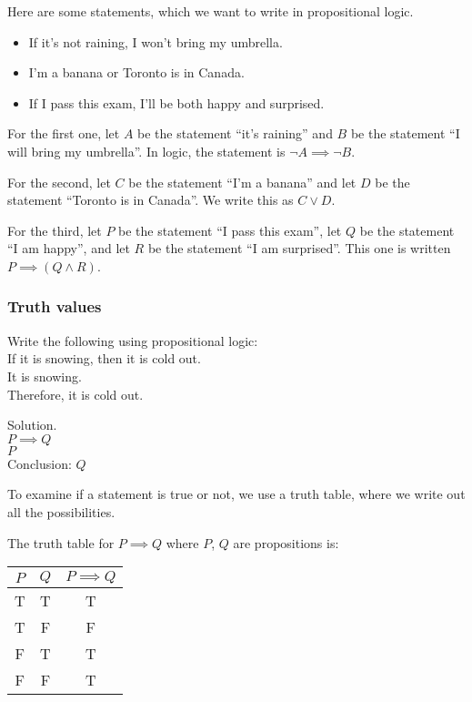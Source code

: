 \documentclass{article}
\begin{document}
\begin{example}
Here are some statements, which we want to write in propositional logic.
\begin{itemize}
              \item If it's not raining, I won't bring my umbrella.
              \item I'm a banana or Toronto is in Canada.
              \item If I pass this exam, I'll be both happy and surprised.
\end{itemize}

For the first one, let $A$ be the statement ``it's raining'' and $B$ be the statement ``I will bring my umbrella''. In logic, the statement is $\neg A \implies \neg B$.

For the second, let $C$ be the statement ``I'm a banana'' and let $D$ be the statement ``Toronto is in Canada''. We write this as $C \vee D$.

For the third, let $P$ be the statement ``I pass this exam'', let $Q$ be the statement ``I am happy'', and let $R$ be the statement ``I am surprised''. This one is written $P \implies (Q \wedge R)$.
\end{example}

\subsubsection{Truth values}

\begin{example} Write the following using propositional logic: \\
If it is snowing, then it is cold out. \\
It is snowing. \\
Therefore, it is cold out.

Solution. \\
$P \implies Q$ \\
$P$ \\
Conclusion: $Q$ \\
\end{example}

To examine if a statement is true or not, we use a truth table, where we write out all the possibilities. 

\begin{example}
The truth table for $P \implies Q$ where $P$, $Q$ are propositions is:

\begin{tabular}{|c|c| c|}
\hline
     $P$& $Q$ &  $P \implies Q$ \\ \hline
     T& T & T \\ \hline
     T & F & F \\ \hline
     F & T & T \\ \hline
     F & F & T \\ \hline
\end{tabular}
\end{example}
\end{document}
